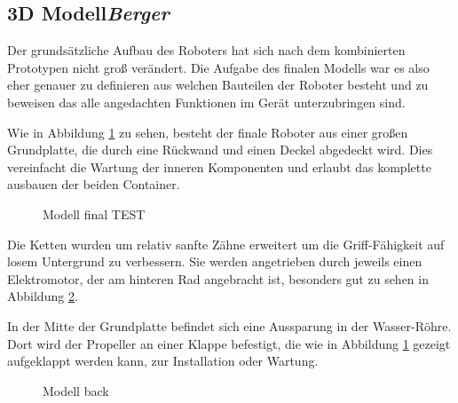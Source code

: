 \subsection{3D Modell\hfill\textnormal{\emph{Berger}}}

Der grundsätzliche Aufbau des Roboters hat sich nach dem kombinierten Prototypen nicht groß verändert.
Die Aufgabe des finalen Modells war es also eher 
genauer zu definieren aus welchen Bauteilen der Roboter besteht
und zu beweisen das alle angedachten Funktionen im Gerät unterzubringen sind.

Wie in Abbildung \ref{fig:model_open_front} zu sehen, 
besteht der finale Roboter aus einer großen Grundplatte, 
die durch eine Rückwand und einen Deckel abgedeckt wird.
Dies vereinfacht die Wartung der inneren Komponenten
und erlaubt das komplette ausbauen der beiden Container.

\begin{figure}[H]
  \caption{Modell final TEST}
  \label{fig:model_open_front}
\end{figure}

Die Ketten wurden um relativ sanfte Zähne erweitert 
um die Griff-Fähigkeit auf losem Untergrund zu verbessern.
Sie werden angetrieben durch jeweils einen Elektromotor,
der am hinteren Rad angebracht ist,
besonders gut zu sehen in Abbildung \ref{fig:model_open_back}.

In der Mitte der Grundplatte befindet sich eine Aussparung in der Wasser-Röhre.
Dort wird der Propeller an einer Klappe befestigt,
die wie in Abbildung \ref{fig:model_open_front} gezeigt
aufgeklappt werden kann, 
zur Installation oder Wartung.

\begin{figure}[H]
  \caption{Modell back}
  \label{fig:model_open_back}
\end{figure}